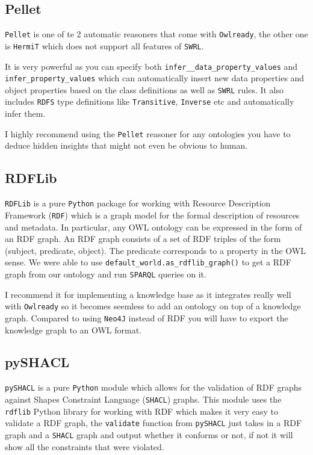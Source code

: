 \documentclass{article}
\begin{document}
\subsection*{Pellet}
\verb|Pellet| is one of te 2 automatic reasoners that come with \verb|Owlready|, the other one is \verb|HermiT| which does not support all features of \verb|SWRL|.

It is very powerful as you can specify both \verb|infer__data_property_values| and \verb|infer_property_values| which can automatically insert new data properties and object properties based on the class definitions as well as \verb|SWRL| rules. It also includes \verb|RDFS| type definitions like \verb|Transitive|, \verb|Inverse| etc and automatically infer them.

I highly recommend using the \verb|Pellet| reasoner for any ontologies you have to deduce hidden insights that might not even be obvious to human.
\subsection*{RDFLib}
\verb|RDFLib| is a pure \verb|Python| package for working with Resource Description Framework (\verb|RDF|) which is a graph model for the formal description of resources and metadata. In particular, any OWL ontology can be expressed in the form of an RDF graph. An RDF graph consists of a set of RDF triples of the form (subject, predicate, object). The predicate corresponds to a property in the OWL sense. We were able to use \verb|default_world.as_rdflib_graph()| to get a RDF graph from our ontology and run \verb|SPARQL| queries on it.

I recommend it for implementing a knowledge base as it integrates really well with \verb|Owlready| so it becomes seemless to add an ontology on top of a knowledge graph. Compared to using \verb|Neo4J| instead of RDF you will have to export the knowledge graph to an OWL format.
\subsection*{pySHACL}
\verb|pySHACL| is a pure \verb|Python| module which allows for the validation of RDF graphs against Shapes Constraint Language (\verb|SHACL|) graphs. This module uses the \verb|rdflib| Python library for working with RDF which makes it very easy to validate a RDF graph, the \verb|validate| function from \verb|pySHACL| just takes in a RDF graph and a \verb|SHACL| graph and output whether it conforms or not, if not it will show all the constraints that were violated.
\end{document}
